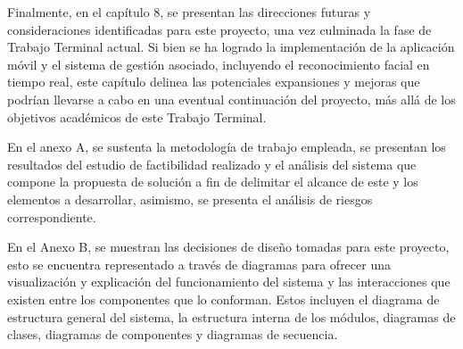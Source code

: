 Finalmente, en el capítulo 8, se presentan las direcciones futuras y consideraciones identificadas para este proyecto, una vez culminada la fase de Trabajo Terminal actual. Si bien se ha logrado la implementación de la aplicación móvil y el sistema de gestión asociado, incluyendo el reconocimiento facial en tiempo real, este capítulo delinea las potenciales expansiones y mejoras que podrían llevarse a cabo en una eventual continuación del proyecto, más allá de los objetivos académicos de este Trabajo Terminal.

En el anexo A, se sustenta la metodología de trabajo empleada, se presentan los resultados del estudio de factibilidad realizado y el análisis del sistema que compone la propuesta de solución a fin de delimitar el alcance de este y los elementos a desarrollar, asimismo, se presenta el análisis de riesgos correspondiente.

En el Anexo B, se muestran las decisiones de diseño tomadas para este proyecto, esto se encuentra representado a través de diagramas para ofrecer una visualización y explicación del funcionamiento del sistema y las interacciones que existen entre los componentes que lo conforman. Estos incluyen el diagrama de estructura general del sistema, la estructura interna de los módulos, diagramas de clases, diagramas de componentes y diagramas de secuencia.



